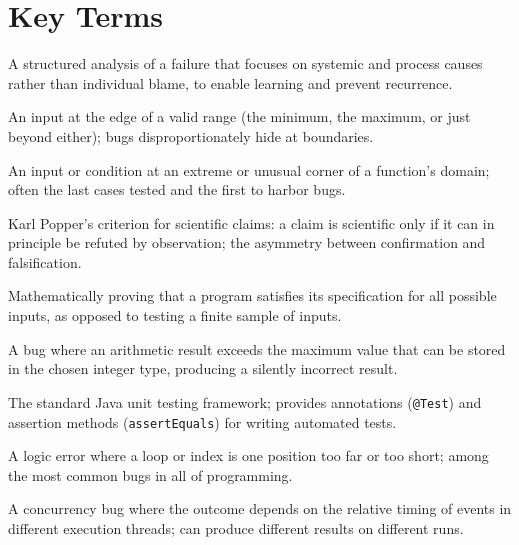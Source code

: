 \documentclass[11pt,letterpaper]{article}
\begin{document}
\section*{Key Terms}

\begin{glossarybox}
\begin{description}[leftmargin=!, labelwidth=3.8cm, font=\bfseries\color{cssecondary}]
    \item[Blameless Postmortem] A structured analysis of a failure that focuses on systemic and process causes rather than individual blame, to enable learning and prevent recurrence.

    \item[Boundary Value] An input at the edge of a valid range (the minimum, the maximum, or just beyond either); bugs disproportionately hide at boundaries.

    \item[Edge Case] An input or condition at an extreme or unusual corner of a function's domain; often the last cases tested and the first to harbor bugs.

    \item[Falsifiability] Karl Popper's criterion for scientific claims: a claim is scientific only if it can in principle be refuted by observation; the asymmetry between confirmation and falsification.

    \item[Formal Verification] Mathematically proving that a program satisfies its specification for all possible inputs, as opposed to testing a finite sample of inputs.

    \item[Integer Overflow] A bug where an arithmetic result exceeds the maximum value that can be stored in the chosen integer type, producing a silently incorrect result.

    \item[JUnit] The standard Java unit testing framework; provides annotations (\texttt{@Test}) and assertion methods (\texttt{assertEquals}) for writing automated tests.

    \item[Off-by-One Error] A logic error where a loop or index is one position too far or too short; among the most common bugs in all of programming.

    \item[Race Condition] A concurrency bug where the outcome depends on the relative timing of events in different execution threads; can produce different results on different runs.


\end{description}
\end{glossarybox}
\end{document}
